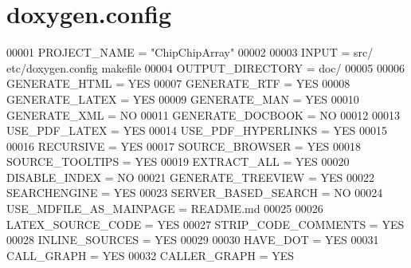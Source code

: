\hypertarget{doxygen_8config_source}{\section{doxygen.\+config}
\label{doxygen_8config_source}
}

\begin{DoxyCode}
00001 PROJECT\_NAME = "ChipChipArray"
00002 
00003 INPUT = src/ etc/doxygen.config makefile
00004 OUTPUT\_DIRECTORY = doc/
00005 
00006 GENERATE\_HTML = YES
00007 GENERATE\_RTF = YES
00008 GENERATE\_LATEX = YES
00009 GENERATE\_MAN = YES
00010 GENERATE\_XML = NO
00011 GENERATE\_DOCBOOK = NO
00012 
00013 USE\_PDF\_LATEX = YES
00014 USE\_PDF\_HYPERLINKS = YES
00015 
00016 RECURSIVE = YES
00017 SOURCE\_BROWSER = YES
00018 SOURCE\_TOOLTIPS = YES
00019 EXTRACT\_ALL = YES
00020 DISABLE\_INDEX = NO
00021 GENERATE\_TREEVIEW = YES
00022 SEARCHENGINE = YES
00023 SERVER\_BASED\_SEARCH = NO
00024 USE\_MDFILE\_AS\_MAINPAGE = README.md
00025 
00026 LATEX\_SOURCE\_CODE = YES
00027 STRIP\_CODE\_COMMENTS = YES
00028 INLINE\_SOURCES = YES
00029 
00030 HAVE\_DOT = YES
00031 CALL\_GRAPH = YES
00032 CALLER\_GRAPH = YES
\end{DoxyCode}
